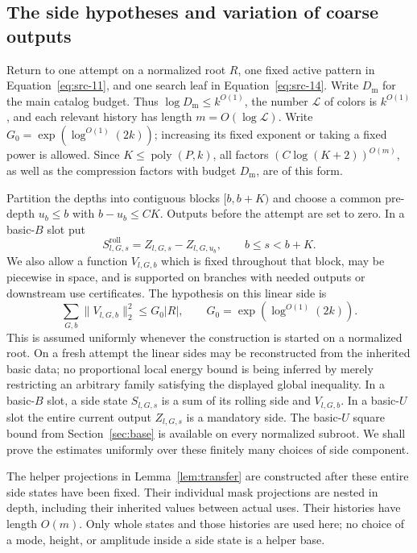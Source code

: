 \subsection{The side hypotheses and variation of coarse outputs}

Return to one attempt on a normalized root $R$, one fixed active
pattern in Equation~\eqref{eq:src-11}, and one search leaf in
Equation~\eqref{eq:src-14}.  Write $D_{\mathrm m}$ for the main
catalog budget.  Thus $\log D_{\mathrm m}\le k^{O(1)}$, the number
$\mathcal L$ of colors is $k^{O(1)}$, and each relevant history has
length $m=O(\log\mathcal L)$.  Write
$G_0=\exp(\log^{O(1)}(2k))$; increasing its fixed exponent or taking
a fixed power is allowed.  Since $K\le\operatorname{poly}(P,k)$,
all factors $(C\log(K+2))^{O(m)}$, as well as the compression factors
with budget $D_{\mathrm m}$, are of this form.

Partition the depths into contiguous blocks $[b,b+K)$ and choose a
common pre-depth $u_b\le b$ with $b-u_b\le C K$.  Outputs before the
attempt are set to zero.  In a basic-$B$ slot put
\[
 S_{l,G,s}^{\mathrm{roll}}=Z_{l,G,s}-Z_{l,G,u_b},
 \qquad b\le s<b+K.
\]
We also allow a function $V_{l,G,b}$ which is fixed throughout that
block, may be piecewise in space, and is supported on branches with
needed outputs or downstream use certificates.  The hypothesis on
this linear side is
\[
 \sum_{G,b}\|V_{l,G,b}\|_2^2\le G_0|R|,
 \qquad G_0=\exp(\log^{O(1)}(2k)).
 \tag{17}\label{eq:src-17}
\]
This is assumed uniformly whenever the construction is started on a
normalized root.  On a fresh attempt the linear sides may be
reconstructed from the inherited basic data; no proportional local
energy bound is being inferred by merely restricting an arbitrary
family satisfying the displayed global inequality.
In a basic-$B$ slot, a side state $S_{l,G,s}$ is a sum of its rolling
side and $V_{l,G,b}$.  In a basic-$U$ slot the entire current output
$Z_{l,G,s}$ is a mandatory side.  The basic-$U$ square bound from
Section~\ref{sec:base} is available on every normalized subroot.
We shall prove the estimates uniformly over these finitely many
choices of side component.

The helper projections in Lemma~\ref{lem:transfer} are constructed
after these entire side states have been fixed.  Their individual
mask projections are nested in depth, including their inherited
values between actual uses.  Their histories have length $O(m)$.
Only whole states and those histories are used here; no choice of a
mode, height, or amplitude inside a side state is a helper base.

